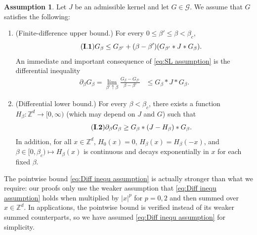 \documentclass[11pt,a4paper]{article}
\numberwithin{equation}{section}
\theoremstyle{plain}
\theoremstyle{definition}
\newtheorem{Ass}{Assumption}
\newcommand\1{\mathds{1}}
\begin{document}
\begin{Ass}
\label{Ass:G}
Let $J$ be an admissible kernel and let $G\in \mathcal G$. We assume that $G$ satisfies the following:
\begin{enumerate}

	\item[$(i)$] (Finite-difference upper bound.) For every $0\leq\beta'\leq \beta<\beta_c$,
	\begin{equation}\label{eq:SL assumption}\tag{$\mathbf{I.1}$}		G_\beta\leq G_{\beta'}+(\beta-\beta')(G_{\beta'}*J*G_\beta).
	\end{equation}
    An immediate and important consequence of
\eqref{eq:SL assumption} is the differential inequality
\begin{align}
\label{eq:dGub}
    \partial_\beta G_\beta
    = \lim_{\beta' \uparrow \beta}\frac{G_\beta - G_{\beta'}}{\beta - \beta'}
    &
    \le
    G_{\beta}*J*G_\beta.
\end{align}
	\item[$(ii)$] (Differential lower bound.) For every $\beta<\beta_c$, there exists a
     function $H_\beta:\mathbb Z^d\rightarrow [0,\infty)$ (which may depend on
     $J$ and $G$) such that
    \begin{equation}\label{eq:Diff inequ assumption}\tag{$\mathbf{I.2}$}
    \partial_\beta G_\beta
    \ge
    G_\beta*(J-H_\beta)*G_\beta  .
	\end{equation}
    In addition, for all $x\in \mathbb Z^d$, $H_0(x)= 0$, $H_\beta(x)=H_\beta(-x)$, and
    $\beta\in [0,\beta_c)\mapsto H_\beta(x)$ is continuous and decays exponentially
    in $x$ for each fixed $\beta$.
\end{enumerate}
\end{Ass}

The pointwise bound \eqref{eq:Diff inequ assumption} is actually stronger than
what we require: our proofs only use the weaker assumption that \eqref{eq:Diff inequ assumption} holds when multiplied by
$|x|^p$ for $p=0,2$ and then summed over
$x\in \mathbb Z^d$.  In applications, the pointwise bound is verified instead of its
weaker summed counterparts, so we have assumed \eqref{eq:Diff inequ assumption} for simplicity.
\end{document}

